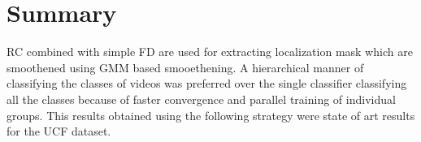 \section{Summary}
RC combined with simple FD are used for extracting localization mask which are smoothened using GMM based smooethening. A hierarchical manner of classifying the classes of videos was preferred over the single classifier classifying  all the classes because of faster convergence and parallel training of individual groups. This results obtained using the following strategy were state of art results for the UCF dataset.  